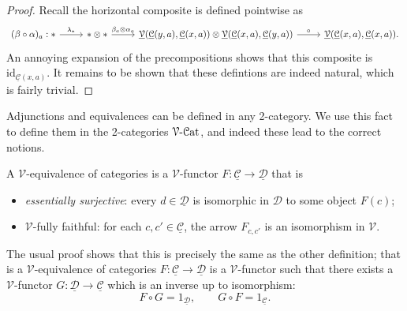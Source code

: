 \begin{proof}
	Recall the horizontal composite is defined pointwise as
	\[\begin{tikzcd}[row sep = 2.5em, column sep = 2.5em]
		(\beta\circ \alpha)_a : * \ar[" \lambda_* ", r]  & *\otimes *\ar[" \beta_a \otimes \alpha_a ", r]  & \underline{\mathcal{V} } (\underline{\mathcal{C} } (y,a),\underline{\mathcal{C} } (x,a))\otimes \underline{\mathcal{V} } (\underline{\mathcal{C} } (x,a),\underline{\mathcal{C} } (y,a))\ar[" \circ  ", r]  & \underline{\mathcal{V} } (\underline{\mathcal{C} } (x,a),\underline{\mathcal{C} } (x,a)).
	\end{tikzcd}\]
	An annoying expansion of the precompositions shows that this composite is $\mathrm{id}_{\underline{\mathcal{C} } (x,a)} $. It remains to be shown that these defintions are indeed natural, which is fairly trivial.
\end{proof}

Adjunctions and equivalences can be defined in any 2-category. We use this fact to define them in the 2-categories $\mathcal{V} \text{-} \mathcal{C}\mathrm{at} $, and indeed these lead to the correct notions.
\begin{definition}\label{dfn:3.7}
	A $\mathcal{V} $-equivalence of categories is a $\mathcal{V} $-functor $F : \underline{\mathcal{C} }  \to \underline{\mathcal{D} } $ that is
	\begin{itemize}
		\item \emph{essentially surjective}: every $d\in\underline{\mathcal{D} } $ is isomorphic in $\mathcal{D} $ to some object $F(c)$;
		\item $\mathcal{V} $-fully faithful: for each $c,c'\in \underline{\mathcal{C} } $, the arrow $F_{c,c'} $ is an isomorphism in $\mathcal{V} $.
	\end{itemize}
	The usual proof shows that this is precisely the same as the other definition; that is a $\mathcal{V} $-equivalence of categories $F : \underline{\mathcal{C} }  \to \underline{\mathcal{D} } $ is a $\mathcal{V} $-functor such that there exists a $\mathcal{V} $-functor $G : \underline{\mathcal{D} }  \to \underline{\mathcal{C} } $ which is an inverse up to isomorphism:
	\[
		F\circ G=1_{\underline{\mathcal{D} } } ,\qquad G\circ F=1_{\underline{\mathcal{C} } } 
	.\]
\end{definition}

